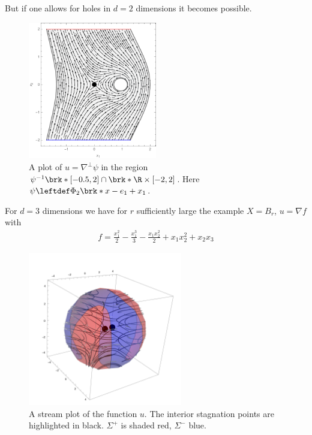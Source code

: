 \begin{frame}
  But if one allows for holes in $d=2$ dimensions it becomes possible.
  \begin{figure}
    \centering
    \includegraphics[width=0.5\textwidth]{../Plots/n2_hvf_InflowOutflow_asymmetric_gray_2.pdf}
    \caption{A plot of $u=\nabla^\perp\psi$ in the region $\psi^{-1}\brk*{[-0.5,2]}\cap \brk*{\R\times[-2,2]}$.
    Here $\psi\leftdef\Phi_2\brk*{x-e_1}+x_1$.}
    \label{pl:n2_hvf_InflowOutflow_asymmetric_single}
  \end{figure}
\end{frame}

\begin{frame}
  For $d=3$ dimensions we have for $r$ sufficiently large the example $X=B_r$, $u=\nabla f$ with
  \begin{align*}
    f=\frac{x_1^2}{2}-\frac{x_1^3}{3}-\frac{x_1x_2^2}{2}+x_1x_2^2+x_2x_3
  \end{align*}
\end{frame}

\begin{frame}
  \begin{figure}
    \centering
    \includegraphics[width=0.6\textwidth]{../plots/n3_hf_inflowOutflow_Ball_overview.pdf}
    \caption{A stream plot of the function $u$. The interior stagnation points are highlighted in black.
    $\Sigma^+$ is shaded red, $\Sigma^-$ blue.}
    \label{pl:n3_hf_inflowOutflowStagnationPoint_overview}
  \end{figure}
\end{frame}

